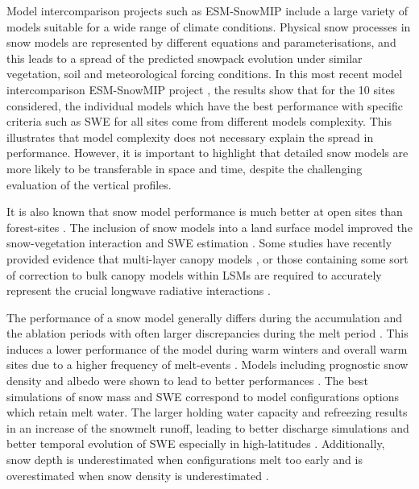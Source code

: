 \documentclass[utf8]{frontiersSCNS} %
\begin{document}
Model intercomparison projects such as ESM-SnowMIP \citep{Krinner_2018} include a large variety of models suitable for a wide range of climate conditions. 
Physical snow processes in snow models are represented by different equations and parameterisations, and this leads to a spread of the predicted snowpack evolution under similar vegetation, soil and meteorological forcing conditions.  In this most recent model intercomparison ESM-SnowMIP project \citep{Krinner_2018}, the results show that for the 10 sites considered, the individual models which have the best performance with specific criteria such as SWE for all sites come from different models complexity. This illustrates that model complexity does not necessary explain the spread in performance. However, it is important to highlight that detailed snow models are more likely to be transferable in space and time, despite the challenging evaluation of the vertical profiles. %

It is also known that snow model performance is much better at open sites than forest-sites \citep{Rutter_2009}. The inclusion of snow models into a land surface model improved the snow-vegetation interaction and SWE estimation \citep{Boone_2017}. Some studies have recently provided evidence that multi-layer canopy models \citep{Gouttevin_2015}, or those containing some sort of correction to bulk canopy models within LSMs are required to accurately represent the crucial longwave radiative interactions \citep{Todt_2018}.

The performance of a snow model generally differs during the accumulation and the ablation periods with often larger discrepancies during the melt period \citep{Etchevers_2004}. This induces a lower performance of the model during warm winters and overall warm sites due to a higher frequency of melt-events \citep{Etchevers_2004}. Models including prognostic snow density and albedo were shown to lead to better performances \citep{Essery_2013,Boone_2004}. The best simulations of snow mass and SWE correspond to model configurations options which retain melt water. The larger holding water capacity and refreezing results in an increase of the snowmelt runoff, leading to better discharge simulations \citep{Boone_2004} and better temporal evolution of SWE especially in high-latitudes \citep{Vionnet_2012,Decharme_2016}. %
Additionally, snow depth is underestimated when configurations melt too early and is overestimated when snow density is underestimated \citep{Essery_2013}.
\end{document}
